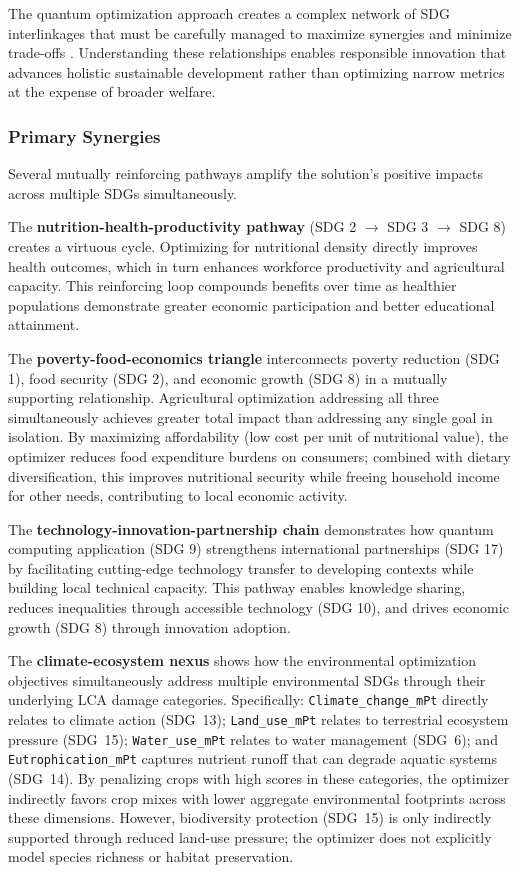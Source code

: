 \documentclass{oqireport}
\begin{document}
The quantum optimization approach creates a complex network of SDG interlinkages that must be carefully managed to maximize synergies and minimize trade-offs \cite{Fanzo2022,UNFSS_Planet_2023,Sylvester2024}. Understanding these relationships enables responsible innovation that advances holistic sustainable development rather than optimizing narrow metrics at the expense of broader welfare.

\subsubsection{Primary Synergies}

Several mutually reinforcing pathways amplify the solution's positive impacts across multiple SDGs simultaneously.

The \textbf{nutrition-health-productivity pathway} (SDG 2 $\rightarrow$ SDG 3 $\rightarrow$ SDG 8) creates a virtuous cycle. Optimizing for nutritional density directly improves health outcomes, which in turn enhances workforce productivity and agricultural capacity. This reinforcing loop compounds benefits over time as healthier populations demonstrate greater economic participation and better educational attainment.

The \textbf{poverty-food-economics triangle} interconnects poverty reduction (SDG 1), food security (SDG 2), and economic growth (SDG 8) in a mutually supporting relationship. Agricultural optimization addressing all three simultaneously achieves greater total impact than addressing any single goal in isolation. By maximizing affordability (low cost per unit of nutritional value), the optimizer reduces food expenditure burdens on consumers; combined with dietary diversification, this improves nutritional security while freeing household income for other needs, contributing to local economic activity.

The \textbf{technology-innovation-partnership chain} demonstrates how quantum computing application (SDG 9) strengthens international partnerships (SDG 17) by facilitating cutting-edge technology transfer to developing contexts while building local technical capacity. This pathway enables knowledge sharing, reduces inequalities through accessible technology (SDG 10), and drives economic growth (SDG 8) through innovation adoption.

The \textbf{climate-ecosystem nexus} shows how the environmental optimization objectives simultaneously address multiple environmental SDGs through their underlying LCA damage categories. Specifically: \texttt{Climate\_change\_mPt} directly relates to climate action (SDG~13); \texttt{Land\_use\_mPt} relates to terrestrial ecosystem pressure (SDG~15); \texttt{Water\_use\_mPt} relates to water management (SDG~6); and \texttt{Eutrophication\_mPt} captures nutrient runoff that can degrade aquatic systems (SDG~14). By penalizing crops with high scores in these categories, the optimizer indirectly favors crop mixes with lower aggregate environmental footprints across these dimensions. However, biodiversity protection (SDG~15) is only indirectly supported through reduced land-use pressure; the optimizer does not explicitly model species richness or habitat preservation.
\end{document}

